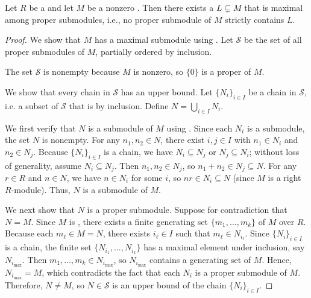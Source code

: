 \begin{proposition}  \label{proposition:nonzero_finitely_generated_module_over_a_ring_has_a_maximal_submodule}
	Let $R$ be a  and let $M$ be a nonzero  . Then there exists a  $L \subsetneq M$ that is maximal among proper submodules, i.e., no proper submodule of $M$ strictly contains $L$.
\end{proposition}

\begin{proof}
    We show that $M$ has a maximal submodule using . Let $\mathcal{S}$ be the set of all proper submodules of $M$, partially ordered by inclusion.

    The set $\mathcal{S}$ is nonempty because $M$ is nonzero, so $\{0\}$ is a proper  of $M$.

    We show that every chain in $\mathcal{S}$ has an upper bound. Let $\{N_i\}_{i \in I}$ be a chain in $\mathcal{S}$, i.e. a subset of $\mathcal{S}$ that is  by inclusion. Define $N = \bigcup_{i \in I} N_i$.

    We first verify that $N$ is a submodule of $M$ using . Since each $N_i$ is a submodule, the set $N$ is nonempty. For any $n_1, n_2 \in N$, there exist $i, j \in I$ with $n_1 \in N_i$ and $n_2 \in N_j$. Because $\{N_i\}_{i \in I}$ is a chain, we have $N_i \subseteq N_j$ or $N_j \subseteq N_i$; without loss of generality, assume $N_i \subseteq N_j$. Then $n_1, n_2 \in N_j$, so $n_1 + n_2 \in N_j \subseteq N$. For any $r \in R$ and $n \in N$, we have $n \in N_i$ for some $i$, so $nr \in N_i \subseteq N$ (since $M$ is a right $R$-module). Thus, $N$ is a submodule of $M$.

    We next show that $N$ is a proper submodule. Suppose for contradiction that $N = M$. Since $M$ is , there exists a finite generating set $\{m_1, \dots, m_k\}$ of $M$ over $R$. Because each $m_\ell \in M = N$, there exists $i_\ell \in I$ such that $m_\ell \in N_{i_\ell}$. Since $\{N_i\}_{i \in I}$ is a chain, the finite set $\{N_{i_1}, \dots, N_{i_k}\}$ has a maximal element under inclusion, say $N_{i_{\max}}$. Then $m_1, \dots, m_k \in N_{i_{\max}}$, so $N_{i_{\max}}$ contains a generating set of $M$. Hence, $N_{i_{\max}} = M$, which contradicts the fact that each $N_i$ is a proper submodule of $M$. Therefore, $N \neq M$, so $N \in \mathcal{S}$ is an upper bound of the chain $\{N_i\}_{i \in I}$.


\end{proof}
